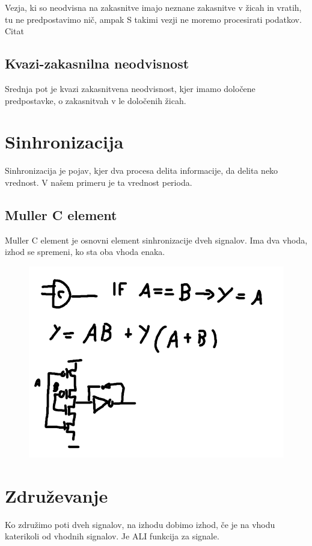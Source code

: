 Vezja, ki so neodvisna na zakasnitve imajo neznane zakasnitve v žicah in vratih, tu ne predpostavimo nič, ampak S takimi vezji ne moremo procesirati podatkov. Citat

\subsection{Kvazi-zakasnilna neodvisnost} \label{b}
Srednja pot je kvazi zakasnitvena neodvisnost, kjer imamo določene predpostavke, o zakasnitvah v le določenih žicah.







\section{Sinhronizacija} \label{a}
Sinhronizacija je pojav, kjer dva procesa delita informacije, da delita neko vrednost. V našem primeru je ta vrednost perioda.

\subsection{Muller C element} \label{c}
Muller C element je osnovni element sinhronizacije dveh signalov. Ima dva vhoda, izhod se spremeni, ko sta oba vhoda enaka.

\begin{figure}[H]
	\centering
	\includegraphics[width=0.7\linewidth]{slike/osnove/C_Element}
	\caption{}
	\label{fig:celement}
\end{figure}



\section{Združevanje} \label{a}
Ko združimo poti dveh signalov, na izhodu dobimo izhod, če je na vhodu katerikoli od vhodnih signalov. Je ALI funkcija za signale.

